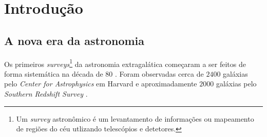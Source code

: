 


\chapter{Introdução}
\label{sec:Intro}


\section{A nova era da astronomia}
\label{sec:Intro:NovaEra}

Os primeiros {\em surveys}\footnote{Um {\em survey} astronômico é um
levantamento de informações ou mapeamento de regiões do céu utlizando
telescópios e detetores.} da astronomia extragalática começaram a ser feitos de
forma sistemática na década de 80 \citep{Huchra1988}. Foram observadas cerca de
$2400$ galáxias pelo {\em Center for Astrophysics} em Harvard \citep{Huchra1983}
e aproximadamente $2000$ galáxias pelo {\em Southern Redshift Survey}
\citep{DaCosta1988}.

